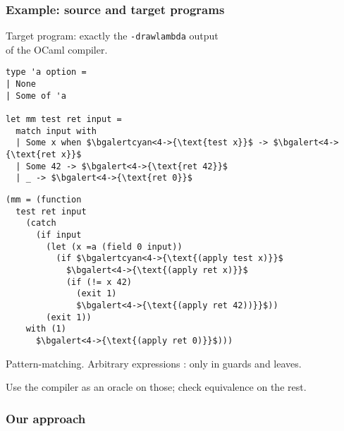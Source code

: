 \documentclass[dvipsnames]{beamer}
\begin{document}
\begin{frame}[fragile]
  \frametitle{Example: source and target programs}
  Target program: exactly the \texttt{-drawlambda} output \\ of the OCaml compiler.


\vfill

\begin{small}
  \hspace{-1em}
  \begin{minipage}{0.36\linewidth}
\begin{lstlisting}
type 'a option =
| None
| Some of 'a

let mm test ret input =
  match input with
  | Some x when $\bgalertcyan<4->{\text{test x}}$ -> $\bgalert<4->{\text{ret x}}$
  | Some 42 -> $\bgalert<4->{\text{ret 42}}$
  | _ -> $\bgalert<4->{\text{ret 0}}$
\end{lstlisting}
  \end{minipage}
  \hfill\pause
  \begin{minipage}{0.64\linewidth}
    \begin{lstlisting}
(mm = (function
  test ret input
    (catch
      (if input
        (let (x =a (field 0 input))
          (if $\bgalertcyan<4->{\text{(apply test x)}}$
            $\bgalert<4->{\text{(apply ret x)}}$
            (if (!= x 42)
              (exit 1)
              $\bgalert<4->{\text{(apply ret 42))}}$))
        (exit 1))
    with (1)
      $\bgalert<4->{\text{(apply ret 0)}}$)))
\end{lstlisting}
  \end{minipage}
\end{small}

\pause\vfill
Pattern-matching. Arbitrary expressions : \pause only in guards and leaves.

\pause\vfill

Use the compiler as an oracle on those;
check equivalence on the rest.
\end{frame}

\begin{frame}[fragile]
\frametitle{Our approach}

\vfill
\begin{center}
\end{center}
\vfill

\end{frame}
\end{document}
